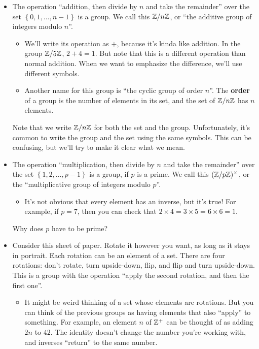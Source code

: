 \documentclass[11pt,paper=letter]{scrartcl}
\renewcommand{\bluebf}[1]{{\bfseries \color{Blue} #1}}
\begin{document}
\begin{itemize}
  \item The operation ``addition, then divide by $n$ and take the remainder'' over the set $ \left\{ 0, 1, \ldots, n - 1 \right\} $ is a group. We call this $\mathbb Z/n\mathbb Z$, or ``the additive group of integers modulo $n$''.
  \begin{itemize}
    \item We'll write its operation as $+$, because it's kinda like addition. In the group $\mathbb Z/5\mathbb Z$, $2 + 4 = 1$. But note that this is a different operation than normal addition. When we want to emphasize the difference, we'll use different symbols.
    \item Another name for this group is ``the cyclic group of order $n$''. The \bluebf{order} of a group is the number of elements in its set, and the set of $\mathbb Z/n\mathbb Z$ has $n$ elements.
  \end{itemize}
  \begin{remboxed}
    Note that we write $\mathbb Z/n\mathbb Z$ for both the set and the group. Unfortunately, it's common to write the group and the set using the same symbols. This can be confusing, but we'll try to make it clear what we mean.
  \end{remboxed}
  \item The operation ``multiplication, then divide by $n$ and take the remainder'' over the set $ \left\{ 1, 2, \ldots, p - 1 \right\} $ is a group, if $p$ is a prime. We call this $(\mathbb Z/p\mathbb Z)^\times$, or the ``multiplicative group of integers modulo $p$''.
  \begin{itemize}
    \item It's not obvious that every element has an inverse, but it's true! For example, if $p = 7$, then you can check that $ 2 \times 4 = 3 \times 5 = 6 \times 6 = 1$.
  \end{itemize}
  \begin{exrboxed}
    Why does $p$ have to be prime?
  \end{exrboxed}
  \item Consider this sheet of paper. Rotate it however you want, as long as it stays in portrait. Each rotation can be an element of a set. There are four rotations: don't rotate, turn upside-down, flip, and flip and turn upside-down. This is a group with the operation ``apply the second rotation, and then the first one''.
  \begin{itemize}
    \item It might be weird thinking of a set whose elements are rotations. But you can think of the previous groups as having elements that also ``apply'' to something. For example, an element $n$ of $\mathbb Z^+$ can be thought of as adding $2n$ to $42$. The identity doesn't change the number you're working with, and inverses ``return'' to the same number.

\end{itemize}
\end{itemize}
\end{document}
